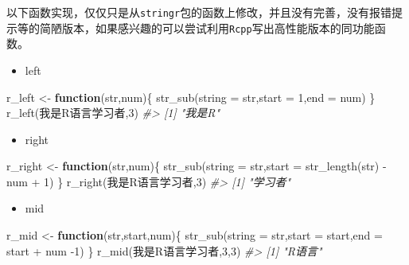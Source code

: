 \documentclass[
]{book}
\newenvironment{Shaded}{\begin{snugshade}}{\end{snugshade}}
\newcommand{\AttributeTok}[1]{\textcolor[rgb]{0.77,0.63,0.00}{#1}}
\newcommand{\CommentTok}[1]{\textcolor[rgb]{0.56,0.35,0.01}{\textit{#1}}}
\newcommand{\ControlFlowTok}[1]{\textcolor[rgb]{0.13,0.29,0.53}{\textbf{#1}}}
\newcommand{\DecValTok}[1]{\textcolor[rgb]{0.00,0.00,0.81}{#1}}
\newcommand{\FunctionTok}[1]{\textcolor[rgb]{0.00,0.00,0.00}{#1}}
\newcommand{\NormalTok}[1]{#1}
\newcommand{\OtherTok}[1]{\textcolor[rgb]{0.56,0.35,0.01}{#1}}
\newcommand{\SpecialCharTok}[1]{\textcolor[rgb]{0.00,0.00,0.00}{#1}}
\newcommand{\StringTok}[1]{\textcolor[rgb]{0.31,0.60,0.02}{#1}}
\providecommand{\tightlist}{%
  \setlength{\itemsep}{0pt}\setlength{\parskip}{0pt}}
\begin{document}
以下函数实现，仅仅只是从\texttt{stringr}包的函数上修改，并且没有完善，没有报错提示等的简陋版本，如果感兴趣的可以尝试利用\texttt{Rcpp}写出高性能版本的同功能函数。

\begin{itemize}
\tightlist
\item
  left
\end{itemize}

\begin{Shaded}
\begin{Highlighting}[]
\NormalTok{r\_left }\OtherTok{\textless{}{-}} \ControlFlowTok{function}\NormalTok{(str,num)\{}
  \FunctionTok{str\_sub}\NormalTok{(}\AttributeTok{string =}\NormalTok{ str,}\AttributeTok{start =} \DecValTok{1}\NormalTok{,}\AttributeTok{end =}\NormalTok{ num)}
\NormalTok{\}}
\FunctionTok{r\_left}\NormalTok{(}\StringTok{\textquotesingle{}我是R语言学习者\textquotesingle{}}\NormalTok{,}\DecValTok{3}\NormalTok{)}
\CommentTok{\#\textgreater{} [1] "我是R"}
\end{Highlighting}
\end{Shaded}

\begin{itemize}
\tightlist
\item
  right
\end{itemize}

\begin{Shaded}
\begin{Highlighting}[]
\NormalTok{r\_right }\OtherTok{\textless{}{-}} \ControlFlowTok{function}\NormalTok{(str,num)\{}
  \FunctionTok{str\_sub}\NormalTok{(}\AttributeTok{string =}\NormalTok{ str,}\AttributeTok{start =} \FunctionTok{str\_length}\NormalTok{(str) }\SpecialCharTok{{-}}\NormalTok{ num }\SpecialCharTok{+} \DecValTok{1}\NormalTok{)}
\NormalTok{\}}
\FunctionTok{r\_right}\NormalTok{(}\StringTok{\textquotesingle{}我是R语言学习者\textquotesingle{}}\NormalTok{,}\DecValTok{3}\NormalTok{)}
\CommentTok{\#\textgreater{} [1] "学习者"}
\end{Highlighting}
\end{Shaded}

\begin{itemize}
\tightlist
\item
  mid
\end{itemize}

\begin{Shaded}
\begin{Highlighting}[]
\NormalTok{r\_mid }\OtherTok{\textless{}{-}} \ControlFlowTok{function}\NormalTok{(str,start,num)\{}
  \FunctionTok{str\_sub}\NormalTok{(}\AttributeTok{string =}\NormalTok{ str,}\AttributeTok{start =}\NormalTok{ start,}\AttributeTok{end =}\NormalTok{ start }\SpecialCharTok{+}\NormalTok{ num }\SpecialCharTok{{-}}\DecValTok{1}\NormalTok{)}
\NormalTok{\}}
\FunctionTok{r\_mid}\NormalTok{(}\StringTok{\textquotesingle{}我是R语言学习者\textquotesingle{}}\NormalTok{,}\DecValTok{3}\NormalTok{,}\DecValTok{3}\NormalTok{)}
\CommentTok{\#\textgreater{} [1] "R语言"}
\end{Highlighting}
\end{Shaded}
\end{document}
